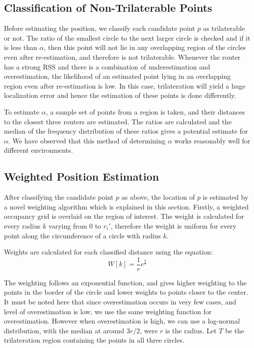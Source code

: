 \documentclass[twocolumn]{svjour3}
\begin{document}
\subsection{\textbf{Classification of Non-Trilaterable Points}}
Before estimating the position, we classify each candidate point $p$ as trilaterable or not. The ratio of the smallest circle to the next larger circle is checked and if it is less than $\alpha$, then this point will not lie in any overlapping region of the circles even after re-estimation, and therefore is not trilaterable. Whenever the router has a strong RSS and there is a combination of underestimation and overestimation, the likelihood of an estimated point lying in an overlapping region even after re-estimation is low. In this case, trilateration will yield a huge localization error and hence the estimation of these points is done differently. 
 
To estimate $\alpha$, a sample set of points from a region is taken, and their distances to the closest three routers are estimated. The ratios are calculated and the median of the frequency distribution of these ratios gives a potential estimate for $\alpha$. We have observed that this method of determining $\alpha$ works reasonably well for different environments.

\subsection{\textbf{Weighted Position Estimation}}

After classifying the candidate point $p$ as above, the location of $p$ is estimated by a novel weighting algorithm which is explained in this section. Firstly, a weighted occupancy grid is overlaid on the region of interest. The weight is calculated for every radius $k$ varying from $0$ to $r_i'$, therefore the weight is uniform for every point along the circumference of a circle with radius $k$.

Weights are calculated for each classified distance using the equation:
\begin{equation}
W[k] = \frac{1}{r}  e^{\frac{k}{r}}    
\end{equation}

The weighting follows an exponential function, and gives higher weighting to the points in the border of the circle and lower weights to points closer to the center.  It must be noted here that since overestimation occurs in very few cases, and level of overestimation is low, we use the same weighting function for overestimation. However when overestimation is high, we can use a log-normal distribution, with the median at around $3r/2$, were $r$ is the radius. Let $T$ be the trilateration region containing the points in all three circles.
\end{document}
